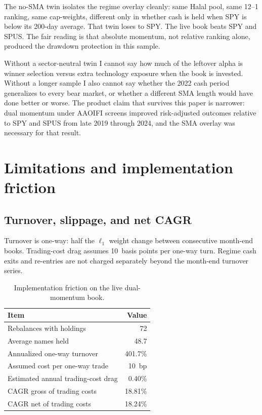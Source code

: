 \documentclass[11pt,letterpaper]{article}
\begin{document}
The no-SMA twin isolates the regime overlay cleanly: same Halal pool, same 12--1 ranking, same cap-weights, different only in whether cash is held when SPY is below its 200-day average. That twin loses to SPY. The live book beats SPY and SPUS. The fair reading is that absolute momentum, not relative ranking alone, produced the drawdown protection in this sample.

Without a sector-neutral twin I cannot say how much of the leftover alpha is winner selection versus extra technology exposure when the book is invested. Without a longer sample I also cannot say whether the 2022 cash period generalizes to every bear market, or whether a different SMA length would have done better or worse. The product claim that survives this paper is narrower: dual momentum under AAOIFI screens improved risk-adjusted outcomes relative to SPY and SPUS from late 2019 through 2024, and the SMA overlay was necessary for that result.

\section{Limitations and implementation friction}
\label{sec:limits}

\subsection{Turnover, slippage, and net CAGR}

Turnover is one-way: half the $\ell_1$ weight change between consecutive month-end books. Trading-cost drag assumes 10~basis points per one-way turn. Regime cash exits and re-entries are not charged separately beyond the month-end turnover series.

\begin{table}[htbp]
\centering
\caption{Implementation friction on the live dual-momentum book.}
\label{tab:friction}
\begin{tabular}{lr}
\toprule
Item & Value \\
\midrule
Rebalances with holdings              & 72 \\
Average names held                    & 48.7 \\
Annualized one-way turnover           & 401.7\% \\
Assumed cost per one-way trade        & 10~bp \\
Estimated annual trading-cost drag    & 0.40\% \\
CAGR gross of trading costs           & 18.81\% \\
CAGR net of trading costs             & 18.24\% \\
\bottomrule
\end{tabular}
\end{table}
\end{document}
